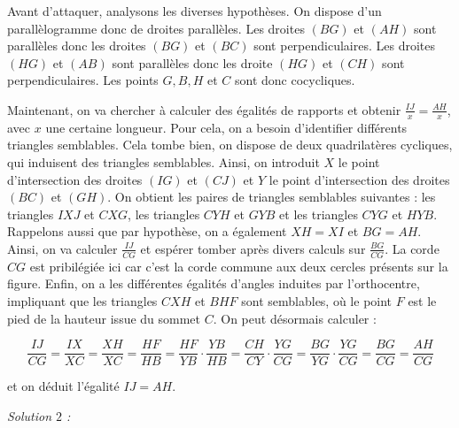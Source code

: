 \begin{sol}
Avant d'attaquer, analysons les diverses hypothèses. On dispose d'un parallèlogramme donc de droites parallèles. Les droites $(BG)$ et $(AH)$ sont parallèles donc les droites $(BG)$ et $(BC)$ sont perpendiculaires. Les droites $(HG)$ et $(AB)$ sont parallèles donc les droite $(HG)$ et $(CH)$ sont perpendiculaires. Les points $G,B,H$ et $C$ sont donc cocycliques.

Maintenant, on va chercher à calculer des égalités de rapports et obtenir $\frac{IJ}{x}=\frac{AH}{x}$, avec $x$ une certaine longueur. Pour cela, on a besoin d'identifier différents triangles semblables. Cela tombe bien, on dispose de deux quadrilatères cycliques, qui induisent des triangles semblables. Ainsi, on introduit $X$ le point d'intersection des droites $(IG)$ et $(CJ)$ et $Y$ le point d'intersection des droites $(BC)$ et $(GH)$. On obtient les paires de triangles semblables suivantes : les triangles $IXJ$ et $CXG$, les triangles $CYH$ et $GYB$ et les triangles $CYG$ et $HYB$. Rappelons aussi que par hypothèse, on a également $XH=XI$ et $BG=AH$. Ainsi, on va calculer $\frac{IJ}{CG}$ et espérer tomber après divers calculs sur $\frac{BG}{CG}$. La corde $CG$ est pribilégiée ici car c'est la corde commune aux deux cercles présents sur la figure. Enfin, on a les différentes égalités d'angles induites par l'orthocentre, impliquant que les triangles $CXH$ et $BHF$ sont semblables, où le point $F$ est le pied de la hauteur issue du sommet $C$. On peut désormais calculer :

$$\frac{IJ}{CG}=\frac{IX}{XC}=\frac{XH}{XC}=\frac{HF}{HB}=\frac{HF}{YB}\cdot \frac{YB}{HB}=\frac{CH}{CY}\cdot \frac{YG}{CG}=\frac{BG}{YG}\cdot \frac{YG}{CG}=\frac{BG}{CG}=\frac{AH}{CG}$$

et on déduit l'égalité $IJ=AH$.

\bigskip

\textit{Solution $2$ :}

\begin{center}
\end{center}
\end{sol}
